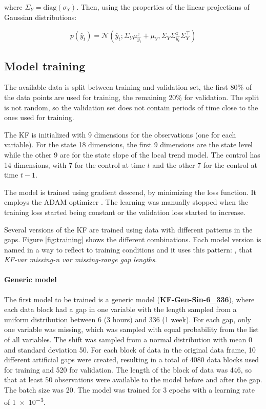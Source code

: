 \documentclass{article}
\newcommand{\norm}[3]{\mathcal{N}\left(#1; #2, #3\right)} %
\let\Oldsubsection\subsection
\renewcommand{\subsection}{\FloatBarrier\Oldsubsection}
\begin{document}
where $\Sigma_Y = \text{diag}(\sigma_Y)$. Then, using the properties of the linear projections of Gaussian distributions:

\begin{equation*}
    p(\hat{y}_t) = \norm{\hat{y}_t}{\Sigma_Y\mu^z_{\hat{y_t}} + \mu_Y}{\Sigma_Y\Sigma^z_{\hat{y_t}}\Sigma_Y^\top}
\end{equation*}

\subsection{Model training}

The available data is split between training and validation set, the first 80\% of the data points are used for training, the remaining 20\% for validation. The split is not random, so the validation set does not contain periods of time close to the ones used for training.

The KF is initialized with 9 dimensions for the observations (one for each variable). For the state 18 dimensions, the first 9 dimensions are the state level while the other 9 are for the state slope of the local trend model. The control has 14 dimensions, with 7 for the control at time $t$ and the other 7 for the control at time $t-1$.

The model is trained using gradient descend, by minimizing the loss function. It employs the ADAM optimizer \cite{kingma_adam_2017}. The learning was manually stopped when the training loss started being constant or the validation loss started to increase.

Several versions of the KF are trained using data with different patterns in the gaps. Figure \ref{fig:training} shows the different combinations. Each model version is named in a way to reflect to training conditions and it uses this pattern: , that  \textit{KF-\textlangle var missing\textrangle-\textlangle n var missing\textrangle-\textlangle range gap lengths}.

\paragraph{Generic model} The first model to be trained is a generic model (\textbf{KF-Gen-Sin-6\_336}), where each data block had a gap in one variable with the length sampled from a uniform distribution between \num{6} (3 hours) and \num{336} (1 week). For each gap, only one variable was missing, which was sampled with equal probability from the list of all variables. The shift was sampled from a normal distribution with mean 0 and standard deviation 50. For each block of data in the original data frame, 10 different artificial gaps were created, resulting in a total of 4080 data blocks used for training and 520 for validation.
The length of the block of data was \num{446}, so that at least \num{50} observations were available to the model before and after the gap. The batch size was \num{20}.
The model was trained for \num{3} epochs with a learning rate of \num{1e-3}.
\end{document}
